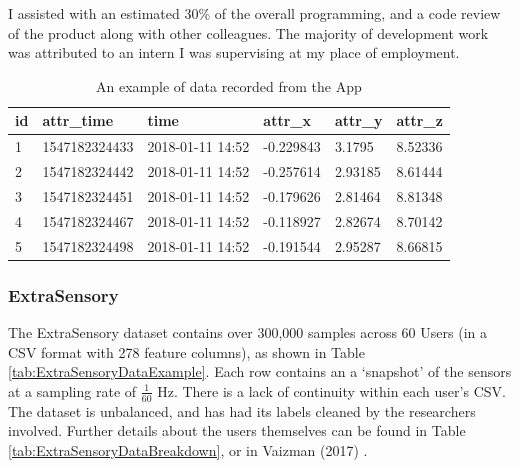 \documentclass{UoNMCHA}
\newcommand{\tref}[1] {Table \ref{#1}}
\numberwithin{equation}{section}
\begin{document}
I assisted with an estimated 30\% of the overall programming, and a code review of the product along with other colleagues. The majority of development work was attributed to an intern I was supervising at my place of employment.





    \begin{table} 
        \begin{center}
            \caption{An example of data recorded from the App}\label{tab:ProjectData}
            \begin{tabular}{llllll}
            \hline\hline id & attr\_time & time & attr\_x   & attr\_y & attr\_z \\ \hline
            1  & 1547182324433 & 2018-01-11 14:52 & -0.229843 & 3.1795  & 8.52336 \\
            2  & 1547182324442 & 2018-01-11 14:52 & -0.257614 & 2.93185 & 8.61444 \\
            3  & 1547182324451 & 2018-01-11 14:52 & -0.179626 & 2.81464 & 8.81348 \\
            4  & 1547182324467 & 2018-01-11 14:52 & -0.118927 & 2.82674 & 8.70142 \\
            5  & 1547182324498 & 2018-01-11 14:52 & -0.191544 & 2.95287 & 8.66815 \\ \hline
            \end{tabular}
        \end{center}
    \end{table}

\subsubsection{ExtraSensory}
The ExtraSensory dataset contains over 300,000 samples across 60 Users (in a CSV format with 278 feature columns), as shown in \tref{tab:ExtraSensoryDataExample}. Each row contains an a `snapshot' of the sensors at a sampling rate of $ \frac{1}{60}$ Hz. There is a lack of continuity within each user's CSV. The dataset is unbalanced, and has had its labels cleaned by the researchers involved. Further details about the users themselves can be found in \tref{tab:ExtraSensoryDataBreakdown}, or in Vaizman (2017) \cite{Vaizman2017}.
\end{document}
